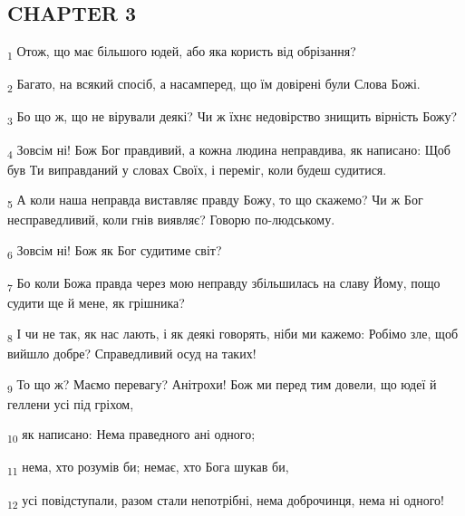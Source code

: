 \subsection{CHAPTER 3}
\begin{tcolorbox}
\textsubscript{1} Отож, що має більшого юдей, або яка користь від обрізання?
\end{tcolorbox}
\begin{tcolorbox}
\textsubscript{2} Багато, на всякий спосіб, а насамперед, що їм довірені були Слова Божі.
\end{tcolorbox}
\begin{tcolorbox}
\textsubscript{3} Бо що ж, що не вірували деякі? Чи ж їхнє недовірство знищить вірність Божу?
\end{tcolorbox}
\begin{tcolorbox}
\textsubscript{4} Зовсім ні! Бож Бог правдивий, а кожна людина неправдива, як написано: Щоб був Ти виправданий у словах Своїх, і переміг, коли будеш судитися.
\end{tcolorbox}
\begin{tcolorbox}
\textsubscript{5} А коли наша неправда виставляє правду Божу, то що скажемо? Чи ж Бог несправедливий, коли гнів виявляє? Говорю по-людському.
\end{tcolorbox}
\begin{tcolorbox}
\textsubscript{6} Зовсім ні! Бож як Бог судитиме світ?
\end{tcolorbox}
\begin{tcolorbox}
\textsubscript{7} Бо коли Божа правда через мою неправду збільшилась на славу Йому, пощо судити ще й мене, як грішника?
\end{tcolorbox}
\begin{tcolorbox}
\textsubscript{8} І чи не так, як нас лають, і як деякі говорять, ніби ми кажемо: Робімо зле, щоб вийшло добре? Справедливий осуд на таких!
\end{tcolorbox}
\begin{tcolorbox}
\textsubscript{9} То що ж? Маємо перевагу? Анітрохи! Бож ми перед тим довели, що юдеї й геллени усі під гріхом,
\end{tcolorbox}
\begin{tcolorbox}
\textsubscript{10} як написано: Нема праведного ані одного;
\end{tcolorbox}
\begin{tcolorbox}
\textsubscript{11} нема, хто розумів би; немає, хто Бога шукав би,
\end{tcolorbox}
\begin{tcolorbox}
\textsubscript{12} усі повідступали, разом стали непотрібні, нема доброчинця, нема ні одного!
\end{tcolorbox}
